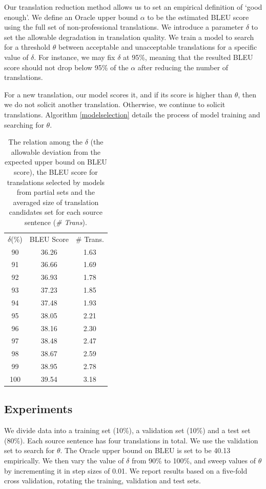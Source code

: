 \documentclass[11pt,letterpaper]{article}
\begin{document}
Our translation reduction method allows us to set an empirical definition of `good enough'.  
We define an Oracle upper bound $\alpha$ to be the estimated BLEU score using the full set of non-professional translations.
We introduce a parameter $\delta$ to set the allowable degradation in translation quality. We train a model to search for a threshold $\theta$ between acceptable and unacceptable translations for a specific value of $\delta$. For instance, we may fix $\delta$ at 95\%, meaning that the resulted BLEU score should not drop below 95\% of the $\alpha$ after reducing the number of translations.   

For a new translation, our model scores it, and if its score is higher than $\theta$, then we do not solicit another translation. Otherwise, we continue to solicit translations.  Algorithm \ref{modelselection} details the process of model training and searching for $\theta$. 


 \begin{table}
 \center
\begin{tabular}{c|c|c}
\hline
$\delta$(\%) & BLEU Score & \# Trans. \\ \hhline{===}
90    & 36.26      & 1.63            \\
91    & 36.66      & 1.69             \\
92    & 36.93      & 1.78             \\
93    & 37.23      & 1.85             \\
94    & 37.48      & 1.93             \\
95    & 38.05      & 2.21             \\
96    & 38.16      & 2.30             \\
97    & 38.48      & 2.47             \\
98    & 38.67      & 2.59             \\
99    & 38.95      & 2.78             \\
100   & 39.54      & 3.18             \\ \hline
\end{tabular}
\caption{The relation among the $\delta$ (the allowable deviation from the expected upper bound on BLEU score), the BLEU score for translations selected by models from partial sets and the averaged size of translation candidates set for each source sentence (\textit{\# Trans}).  }
    \label{orderanother}
\end{table}


\subsection{Experiments}
 We divide data into a training set (10\%), a validation set (10\%) and a test set (80\%). Each source sentence has four translations in total. We use the validation set to search for $\theta$.  The Oracle upper bound on BLEU is set to be 40.13 empirically. 
We then vary the value of $\delta$ from 90\% to 100\%, and sweep values of $\theta$ by incrementing it in step sizes of 0.01.
We report results based on a five-fold cross validation, rotating the training, validation and test sets.
\end{document}

